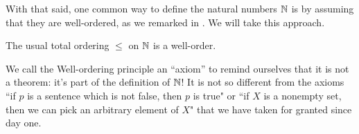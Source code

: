 \documentclass[../main.tex]{subfiles}
\begin{document}
With that said, one common way to define the natural numbers $\mathbb N$ is by assuming that they are well-ordered, as we remarked in . We will take this approach.
\begin{axiom}  \label{ax:wop}
    The usual total ordering $\le$ on $\mathbb N$ is a well-order.
\end{axiom}
We call the Well-ordering principle an ``axiom'' to remind ourselves that it is not a theorem: it's part of the definition of $\mathbb N$!
It is not so different from the axioms ``if $p$ is a sentence which is not false, then $p$ is true" or ``if $X$ is a nonempty set, then we can pick an arbitrary element of $X$" that we have taken for granted since day one.
\end{document}

